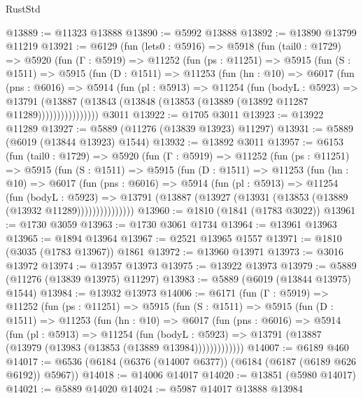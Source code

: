 \begin{lexlean}{RustStd}
\begin{coremodule}
@13889 := @11323 @13888
@13890 := @5992 @13888
@13892 := @13890 @13799 @11219
@13921 := @6129
    (fun (lets0 : @5916) =>
    @5918
      (fun (tail0 : @1729) =>
      @5920
        (fun (Γ : @5919) =>
        @11252
          (fun (ps : @11251) =>
          @5915
            (fun (S : @1511) =>
            @5915
              (fun (D : @1511) =>
              @11253
                (fun (hn : @10) =>
                @6017
                  (fun (pns : @6016) =>
                  @5914
                    (fun (pl : @5913) =>
                    @11254
                      (fun (bodyL : @5923) =>
                      @13791
                        (@13887
                          (@13843 (@13848 (@13853 (@13889 (@13892 @11287 @11289))))))))))))))))
    @3011
@13922 := @1705 @3011
@13923 := @13922 @11289
@13927 := @5889 (@11276 (@13839 @13923) @11297)
@13931 := @5889 (@6019 (@13844 @13923) @1544)
@13932 := @13892 @3011
@13957 := @6153
    (fun (tail0 : @1729) =>
    @5920
      (fun (Γ : @5919) =>
      @11252
        (fun (ps : @11251) =>
        @5915
          (fun (S : @1511) =>
          @5915
            (fun (D : @1511) =>
            @11253
              (fun (hn : @10) =>
              @6017
                (fun (pns : @6016) =>
                @5914
                  (fun (pl : @5913) =>
                  @11254
                    (fun (bodyL : @5923) =>
                    @13791 (@13887 (@13927 (@13931 (@13853 (@13889 (@13932 @11289)))))))))))))))
@13960 := @1810 (@1841 (@1783 @3022))
@13961 := @1730 @3059
@13963 := @1730 @3061 @1734
@13964 := @13961 @13963
@13965 := @1894 @13964
@13967 := @2521 @13965 @1557
@13971 := @1810 (@3035 (@1783 @13967)) @1861
@13972 := @13960 @13971
@13973 := @3016 @13972
@13974 := @13957 @13973
@13975 := @13922 @13973
@13979 := @5889 (@11276 (@13839 @13975) @11297)
@13983 := @5889 (@6019 (@13844 @13975) @1544)
@13984 := @13932 @13973
@14006 := @6171
    (fun (Γ : @5919) =>
    @11252
      (fun (ps : @11251) =>
      @5915
        (fun (S : @1511) =>
        @5915
          (fun (D : @1511) =>
          @11253
            (fun (hn : @10) =>
            @6017
              (fun (pns : @6016) =>
              @5914
                (fun (pl : @5913) =>
                @11254
                  (fun (bodyL : @5923) =>
                  @13791 (@13887 (@13979 (@13983 (@13853 (@13889 @13984)))))))))))))
@14007 := @6189 @460
@14017 := @6536 (@6184 (@6376 (@14007 @6377)) (@6184 (@6187 (@6189 @626 @6192)) @5967))
@14018 := @14006 @14017
@14020 := @13851 (@5980 @14017)
@14021 := @5889 @14020
@14024 := @5987 @14017 @13888 @13984

\end{coremodule}
\end{lexlean}

